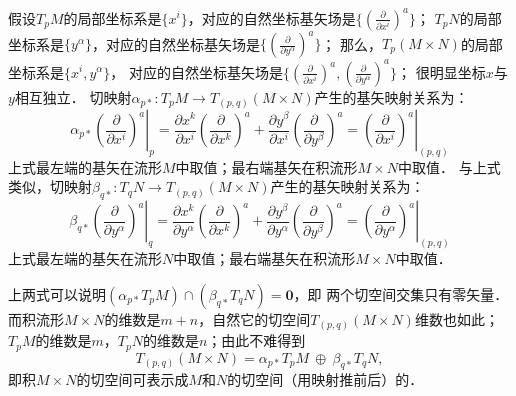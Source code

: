 假设$T_p M$的局部坐标系是$\{x^i\}$，对应的自然坐标基矢场是$\{(\frac{\partial }{\partial x^i})^a\}$；
$T_p N$的局部坐标系是$\{y^\alpha\}$，对应的自然坐标基矢场是$\{(\frac{\partial }{\partial y^\alpha})^a\}$；
那么，$T_p (M\times N)$的局部坐标系是$\{x^i,y^\alpha\}$，
对应的自然坐标基矢场是$\{(\frac{\partial }{\partial x^i})^a,(\frac{\partial }{\partial y^\alpha})^a\}$；
很明显坐标$x$与$y$相互独立．
切映射$\alpha_{p*} : T_p M \to T_{(p,q)}(M\times N)$产生的基矢映射关系为：
\begin{equation}
    \alpha_{p*} \left. \left(\frac{\partial }{\partial x^i}\right)^a \right|_{p}=
    \frac{\partial x^k}{\partial x^i}\left(\frac{\partial }{\partial x^k}\right)^a
    +\frac{\partial y^\beta}{\partial x^i}\left(\frac{\partial }{\partial y^\beta}\right)^a
    =\left. \left(\frac{\partial }{\partial x^i}\right)^a \right|_{{(p,q)}}
\end{equation}
上式最左端的基矢在流形$M$中取值；最右端基矢在积流形$M\times N$中取值．
与上式类似，切映射$\beta_{q*} : T_q N \to T_{(p,q)}(M\times N)$产生的基矢映射关系为：
\begin{equation}
    \beta_{q*} \left. \left(\frac{\partial }{\partial y^\alpha}\right)^a \right|_{q}=
    \frac{\partial x^k}{\partial y^\alpha}\left(\frac{\partial }{\partial x^k}\right)^a
    +\frac{\partial y^\beta}{\partial y^\alpha}\left(\frac{\partial }{\partial y^\beta}\right)^a
    =\left. \left(\frac{\partial }{\partial y^\alpha}\right)^a \right|_{{(p,q)}}
\end{equation}
上式最左端的基矢在流形$N$中取值；最右端基矢在积流形$M\times N$中取值．

上两式可以说明$(\alpha_{p*} T_p M) \cap (\beta_{q*}  T_q N) =\boldsymbol{0}$，即
两个切空间交集只有零矢量．而积流形$M\times N$的维数是$m+n$，自然它的切空间$T_{(p,q)} (M\times N)$维数也如此；
$T_p M$的维数是$m$，$T_p N$的维数是$n$；由此不难得到
\begin{equation}
    T_{(p,q)} (M\times N) = \alpha_{p*} T_p M \ \oplus\ \beta_{q*}  T_q N ,
\end{equation}
即积$M\times N$的切空间可表示成$M$和$N$的切空间（用映射推前后）的．


